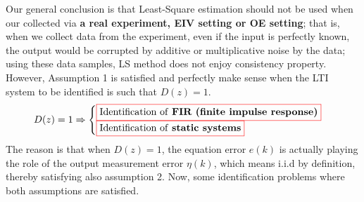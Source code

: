 Our general conclusion is that Least-Square estimation should not be used when our collected via \textbf{a real experiment, EIV setting or OE setting}; that is, when we collect data from the experiment, even if the input is perfectly known, the output would be corrupted by additive or multiplicative noise by the data; using these data samples, LS method does not enjoy consistency property. However, Assumption 1 is satisfied and perfectly make sense when the LTI system to be identified is such that \(D(z) =  1\).\\
\[
D(z) = 1 \Rightarrow
\begin{cases}
\textcolor{red}{\fbox{\textcolor{black}{$
\text{Identification of \textbf{FIR (finite impulse response)}}
$}}}\\
\textcolor{red}{\fbox{\textcolor{black}{$\text{Identification of \textbf{static systems}}
$}}}
\end{cases}
\]
The reason is that when \(D(z) = 1\), the equation error \(e(k)\) is actually playing the role of the output measurement error \(\eta(k)\), which means i.i.d by definition, thereby satisfying also assumption 2. Now, some identification problems where both assumptions are satisfied.
